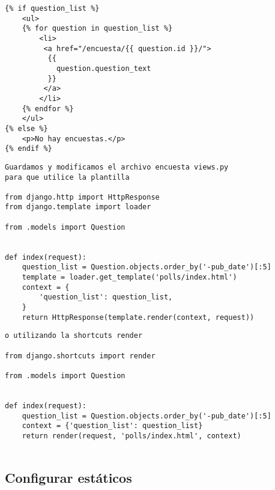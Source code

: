 \documentclass[xcolor=dvipsnames]{beamer}
\begin{document}
\begin{frame}[fragile]
\begin{verbatim}
{% if question_list %}
    <ul>
    {% for question in question_list %}
        <li>
         <a href="/encuesta/{{ question.id }}/">
          {{
            question.question_text
          }}
         </a>
        </li>
    {% endfor %}
    </ul>
{% else %}
    <p>No hay encuestas.</p>
{% endif %}
\end{verbatim}
\end{frame}

\begin{frame}[fragile]
\begin{verbatim}
Guardamos y modificamos el archivo encuesta views.py 
para que utilice la plantilla

from django.http import HttpResponse
from django.template import loader

from .models import Question


def index(request):
    question_list = Question.objects.order_by('-pub_date')[:5]
    template = loader.get_template('polls/index.html')
    context = {
        'question_list': question_list,
    }
    return HttpResponse(template.render(context, request))

\end{verbatim}
\end{frame}

\begin{frame}[fragile]
\begin{verbatim}
o utilizando la shortcuts render

from django.shortcuts import render

from .models import Question


def index(request):
    question_list = Question.objects.order_by('-pub_date')[:5]
    context = {'question_list': question_list}
    return render(request, 'polls/index.html', context)


\end{verbatim}
\end{frame}

\subsection{Configurar estáticos}
\begin{frame}[fragile]
\begin{verbatim}

\end{verbatim}
\end{frame}
\end{document}
